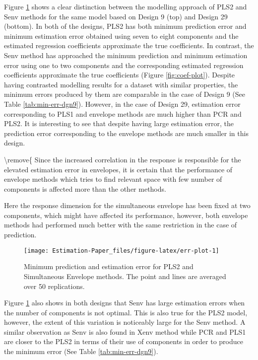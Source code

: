 \documentclass[12pt,3p,authoryear]{elsarticle}
\begin{document}
Figure \ref{fig:err-plot} shows a clear distinction between the modelling approach of PLS2 and Senv methods for the same model based on Design 9 (top) and Design 29 (bottom). In both of the designs, PLS2 has both minimum prediction error and minimum estimation error obtained using seven to eight components and the estimated regression coefficients approximate the true coefficients. In contrast, the Senv method has approached the minimum prediction and minimum estimation error using one to two components and the corresponding estimated regression coefficients approximate the true coefficients (Figure \ref{fig:coef-plot}). Despite having contrasted modelling results for a dataset with similar properties, the minimum errors produced by them are comparable in the case of Design 9 (See Table \ref{tab:min-err-dgn9}). However, in the case of Design 29, estimation error corresponding to PLS1 and envelope methods are much higher than PCR and PLS2. It is interesting to see that despite having large estimation error, the prediction error corresponding to the envelope methods are much smaller in this design.

\textbackslash remove\{
Since the increased correlation in the response is responsible for the elevated estimation error in envelopes, it is certain that the performance of envelope methods which tries to find relevant space with few number of components is affected more than the other methods.

Here the response dimension for the simultaneous envelope has been fixed at two components, which might have affected its performance, however, both envelope methods had performed much better with the same restriction in the case of prediction.

\begin{figure}
\texttt{[image: Estimation-Paper\_files/figure-latex/err-plot-1]} \caption{Minimum prediction and estimation error for PLS2 and Simultaneous Envelope methods. The point and lines are averaged over 50 replications.}\label{fig:err-plot}
\end{figure}

Figure \ref{fig:err-plot} also shows in both designs that Senv has large estimation errors when the number of components is not optimal. This is also true for the PLS2 model, however, the extent of this variation is noticeably large for the Senv method. A similar observation as Senv is also found in Xenv method while PCR and PLS1 are closer to the PLS2 in terms of their use of components in order to produce the minimum error (See Table \ref{tab:min-err-dgn9}).
\end{document}
